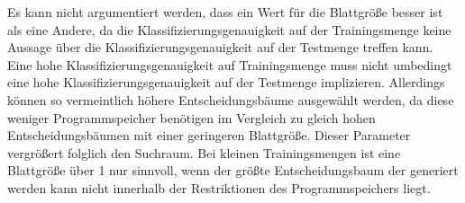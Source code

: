 \newline
\newline
Es kann nicht argumentiert werden, dass ein Wert für die Blattgröße besser ist als eine Andere, da die Klassifizierungsgenauigkeit auf der Trainingsmenge keine Aussage über die Klassifizierungsgenauigkeit auf
der Testmenge treffen kann. Eine hohe Klassifizierungsgenauigkeit auf Trainingsmenge muss nicht umbedingt eine hohe Klassifizierungsgenauigkeit auf der Testmenge implizieren. Allerdings können so vermeintlich
höhere Entscheidungsbäume ausgewählt werden, da diese weniger Programmspeicher benötigen im Vergleich zu gleich hohen Entscheidungsbäumen mit einer geringeren Blattgröße. Dieser Parameter vergrößert folglich
den Suchraum. Bei kleinen Trainingsmengen ist eine Blattgröße über 1 nur sinnvoll, wenn der größte Entscheidungsbaum der generiert werden kann nicht innerhalb der Restriktionen des Programmspeichers liegt.